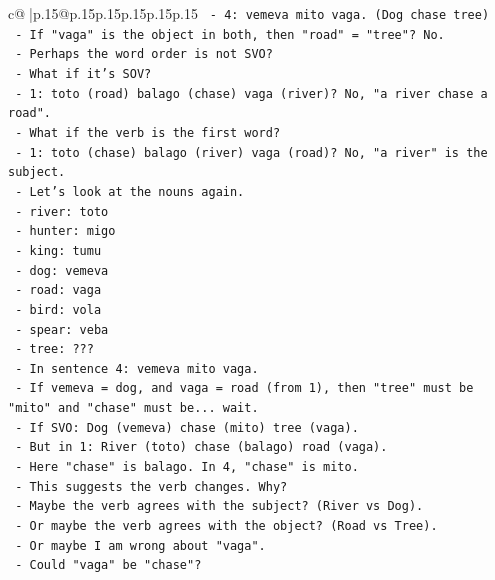 \documentclass{article}
\begin{document}
{\begin{supertabular}{c@{$\;$}|p{.15\linewidth}@{}p{.15\linewidth}p{.15\linewidth}p{.15\linewidth}p{.15\linewidth}p{.15\linewidth}}
{{{\texttt{        {-} 4: vemeva mito vaga. (Dog chase tree)} \\
\texttt{        {-} If "vaga" is the object in both, then "road" = "tree"? No.} \\
\texttt{        {-} Perhaps the word order is not SVO?} \\
\texttt{        {-} What if it's SOV?} \\
\texttt{          {-} 1: toto (road) balago (chase) vaga (river)? No, "a river chase a road".} \\
\texttt{        {-} What if the verb is the first word?} \\
\texttt{          {-} 1: toto (chase) balago (river) vaga (road)? No, "a river" is the subject.} \\
\texttt{        {-} Let's look at the nouns again.} \\
\texttt{          {-} river: toto} \\
\texttt{          {-} hunter: migo} \\
\texttt{          {-} king: tumu} \\
\texttt{          {-} dog: vemeva} \\
\texttt{          {-} road: vaga} \\
\texttt{          {-} bird: vola} \\
\texttt{          {-} spear: veba} \\
\texttt{          {-} tree: ???} \\
\texttt{        {-} In sentence 4: vemeva mito vaga.} \\
\texttt{        {-} If vemeva = dog, and vaga = road (from 1), then "tree" must be "mito" and "chase" must be... wait.} \\
\texttt{        {-} If SVO: Dog (vemeva) chase (mito) tree (vaga).} \\
\texttt{        {-} But in 1: River (toto) chase (balago) road (vaga).} \\
\texttt{        {-} Here "chase" is balago. In 4, "chase" is mito.} \\
\texttt{        {-} This suggests the verb changes. Why?} \\
\texttt{        {-} Maybe the verb agrees with the subject? (River vs Dog).} \\
\texttt{        {-} Or maybe the verb agrees with the object? (Road vs Tree).} \\
\texttt{        {-} Or maybe I am wrong about "vaga".} \\
\texttt{        {-} Could "vaga" be "chase"?} \\
}}}
\end{supertabular}}
\end{document}

